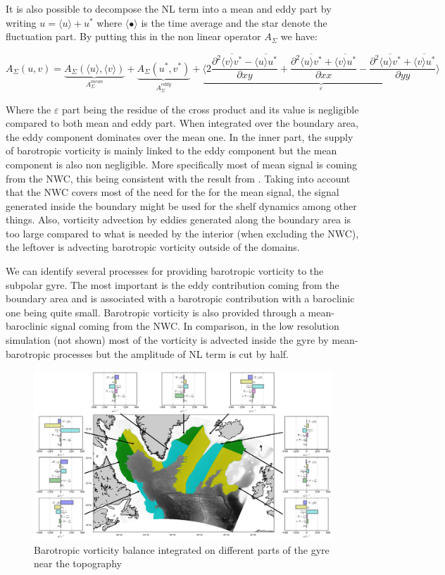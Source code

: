 \documentclass{ametsoc}
\begin{document}
It is also possible to decompose the NL term into a mean and eddy part by writing $u = \langle u \rangle + u^*$ where $\langle \bullet\rangle$ is the time average and the star denote the fluctuation part. By putting this in the non linear operator $A_{\Sigma}$ we have:

$$A_{\Sigma}(u,v)=\underbrace{A_{\Sigma}(\langle u \rangle, \langle v \rangle)}_{A_{\Sigma}^{mean}} + \underbrace{A_{\Sigma}(u^*,v^*)}_{A_{\Sigma}^{eddy}} +\underbrace{\langle  2\frac{\partial ^2 \overline{\langle v \rangle v^*} -\overline{\langle u \rangle u^*}}{\partial xy} +\frac{\partial ^2 \overline{\langle u \rangle v^*} + \overline{\langle v \rangle u^*}}{\partial xx} - \frac{\partial ^2 \overline{\langle u \rangle v^*} +\overline{ \langle v \rangle u^*}}{\partial yy}\rangle}_{\varepsilon}$$

Where the $\varepsilon$ part being the residue of the cross product and its value is negligible compared to both mean and eddy part. When integrated over the boundary area, the eddy component dominates over the mean one. In the inner part, the supply of barotropic vorticity is mainly linked to the eddy component but the mean component is also non negligible. More specifically most of mean signal is coming from the NWC, this being consistent with the result from \citet{wang2017}. Taking into account that the NWC covers most of the need for the for the mean signal, the signal generated inside the boundary might be used for the shelf dynamics among other things. Also, vorticity advection by eddies generated along the boundary area is too large compared to what is needed by the interior (when excluding the NWC), the leftover is advecting barotropic vorticity outside of the domains. 


We can identify several processes for providing barotropic vorticity to the subpolar gyre. The most important is the eddy contribution coming from the boundary area and is associated with a barotropic contribution with a baroclinic one being quite small. Barotropic vorticity is also provided through a mean-baroclinic signal coming from the NWC. In comparison, in the low resolution simulation (not shown) most of the vorticity is advected inside the gyre by mean-barotropic processes but the amplitude of NL term is cut by half.



\begin{figure}[t]
\centerline{\includegraphics[width=15cm]{./v_b/int_sous_zones_3sv.png}}
\caption{Barotropic vorticity balance integrated on different parts of the gyre near the topography}
\label{bv_zones}
\end{figure}
\end{document}
